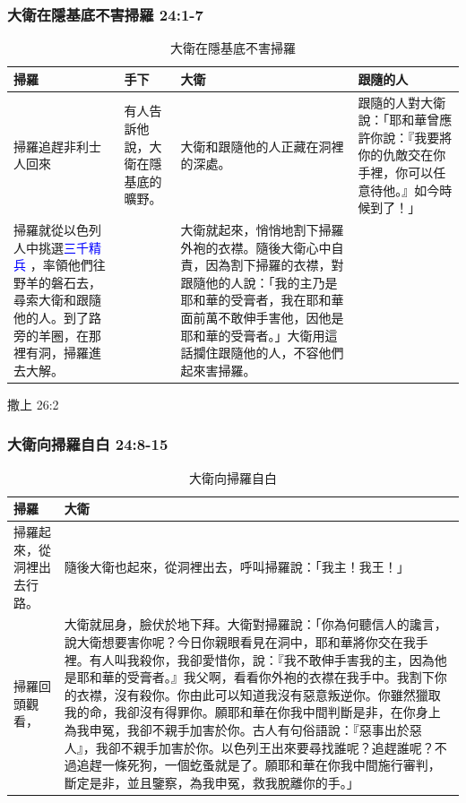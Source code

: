 \subsubsection{大衛在隱基底不害掃羅 24:1-7}
\begin{table}[H]
\hspace*{-5mm}
\begin{minipage}{10cm}
\begin{threeparttable}[t]
\centering
\begin{tabular}{p{}|p{1.7cm}||p{}|p{4.2cm}}\hline\hline
掃羅&手下&大衛&跟隨的人 \\\hline
掃羅追趕非利士人回來&有人告訴他說，大衛在隱基底的曠野。&大衛和跟隨他的人正藏在洞裡的深處。 &跟隨的人對大衛說：「耶和華曾應許你說：『我要將你的仇敵交在你手裡，你可以任意待他。』如今時候到了！」  \\\hline
掃羅就從以色列人中挑選\textcolor{blue}{三千精兵\tnote{1} }，率領他們往野羊的磐石去，尋索大衛和跟隨他的人。到了路旁的羊圈，在那裡有洞，掃羅進去大解。&&大衛就起來，悄悄地割下掃羅外袍的衣襟。隨後大衛心中自責，因為割下掃羅的衣襟，對跟隨他的人說：「我的主乃是耶和華的受膏者，我在耶和華面前萬不敢伸手害他，因他是耶和華的受膏者。」大衛用這話攔住跟隨他的人，不容他們起來害掃羅。& \\\hline
\end{tabular}
\begin{tablenotes}
     \item[1] 撒上 26:2
   \end{tablenotes}
\end{threeparttable}
\end{minipage}
\caption{大衛在隱基底不害掃羅}
\end{table}


\subsubsection{大衛向掃羅自白 24:8-15}
\begin{table}[H]
\hspace*{-5mm}
\centering
\begin{tabular}{p{4.3cm}|p{13.5cm}}\hline\hline
掃羅&大衛 \\\hline
掃羅起來，從洞裡出去行路。&隨後大衛也起來，從洞裡出去，呼叫掃羅說：「我主！我王！」 \\\hline
掃羅回頭觀看，&大衛就屈身，臉伏於地下拜。大衛對掃羅說：「你為何聽信人的讒言，說大衛想要害你呢？今日你親眼看見在洞中，耶和華將你交在我手裡。有人叫我殺你，我卻愛惜你，說：『我不敢伸手害我的主，因為他是耶和華的受膏者。』我父啊，看看你外袍的衣襟在我手中。我割下你的衣襟，沒有殺你。你由此可以知道我沒有惡意叛逆你。你雖然獵取我的命，我卻沒有得罪你。願耶和華在你我中間判斷是非，在你身上為我申冤，我卻不親手加害於你。古人有句俗語說：『惡事出於惡人』，我卻不親手加害於你。以色列王出來要尋找誰呢？追趕誰呢？不過追趕一條死狗，一個虼蚤就是了。願耶和華在你我中間施行審判，斷定是非，並且鑒察，為我申冤，救我脫離你的手。」 \\\hline
\end{tabular}
\caption{大衛向掃羅自白}
\end{table}

